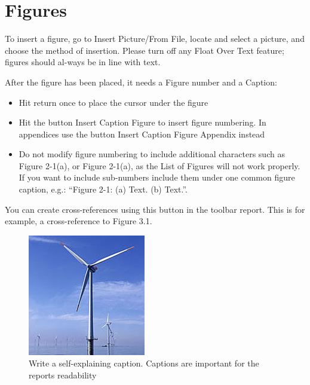 \section{Figures}
To insert a figure, go to Insert Picture/From File, locate and select a picture, and choose the method of insertion. Please turn off any Float Over Text feature; figures should al-ways be in line with text.

After the figure has been placed, it needs a Figure number and a Caption:
\begin{itemize}
	\item Hit return once to place the cursor under the figure
	\item Hit the button Insert Caption Figure to insert figure numbering. In appendices use the button Insert Caption Figure Appendix instead
	\item Do not modify figure numbering to include additional characters such as Figure 2-1(a), or Figure 2-1(a), as the List of Figures will not work properly. If you want to include sub-numbers include them under one common figure caption, e.g.: “Figure 2-1: (a) Text. (b) Text.”.
\end{itemize}

You can create cross-references using this button in the toolbar report. This is for example, a cross-reference to Figure 3.1.

\begin{figure}[h]
	\centering
	\includegraphics[scale=1]{figures/windmill.png}
	\caption{Write a self-explaining caption. Captions are important for the reports readability}
\end{figure}

